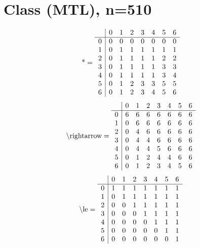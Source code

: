\documentclass[11pt]{article}
\begin{document}
\section{Class (MTL), n=510}
\[\text{*} = 
\begin{array}{r | r r r r r r r}
 & 0 & 1 & 2 & 3 & 4 & 5 & 6 \\ \hline
0 & 0 & 0 & 0 & 0 & 0 & 0 & 0 \\
1 & 0 & 1 & 1 & 1 & 1 & 1 & 1 \\
2 & 0 & 1 & 1 & 1 & 1 & 2 & 2 \\
3 & 0 & 1 & 1 & 1 & 1 & 3 & 3 \\
4 & 0 & 1 & 1 & 1 & 1 & 3 & 4 \\
5 & 0 & 1 & 2 & 3 & 3 & 5 & 5 \\
6 & 0 & 1 & 2 & 3 & 4 & 5 & 6 \\
\end{array}
\]
\[\text{\textbackslash rightarrow} = 
\begin{array}{r | r r r r r r r}
 & 0 & 1 & 2 & 3 & 4 & 5 & 6 \\ \hline
0 & 6 & 6 & 6 & 6 & 6 & 6 & 6 \\
1 & 0 & 6 & 6 & 6 & 6 & 6 & 6 \\
2 & 0 & 4 & 6 & 6 & 6 & 6 & 6 \\
3 & 0 & 4 & 4 & 6 & 6 & 6 & 6 \\
4 & 0 & 4 & 4 & 5 & 6 & 6 & 6 \\
5 & 0 & 1 & 2 & 4 & 4 & 6 & 6 \\
6 & 0 & 1 & 2 & 3 & 4 & 5 & 6 \\
\end{array}
\]
\[\text{\textbackslash le} = 
\begin{array}{r | r r r r r r r}
 & 0 & 1 & 2 & 3 & 4 & 5 & 6 \\ \hline
0 & 1 & 1 & 1 & 1 & 1 & 1 & 1 \\
1 & 0 & 1 & 1 & 1 & 1 & 1 & 1 \\
2 & 0 & 0 & 1 & 1 & 1 & 1 & 1 \\
3 & 0 & 0 & 0 & 1 & 1 & 1 & 1 \\
4 & 0 & 0 & 0 & 0 & 1 & 1 & 1 \\
5 & 0 & 0 & 0 & 0 & 0 & 1 & 1 \\
6 & 0 & 0 & 0 & 0 & 0 & 0 & 1 \\
\end{array}
\]
\end{document}
